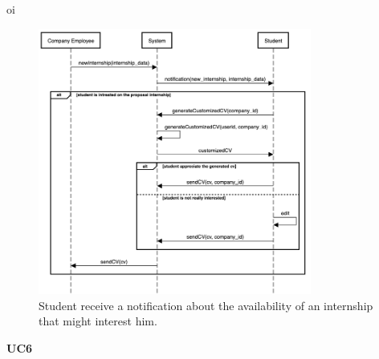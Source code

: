 oi
    \begin{figure}[H]
        \centering
        \includegraphics[width=0.8\textwidth]{RASD/Assets/SequenceDiagrams/5-student-receives-a-notification.png}
        \caption{Student receive a notification about the availability of an internship that might interest him.}
        \label{fig:Student receive a notification about the availability of an internship that might interest him}
    \end{figure}


    \textbf{UC6}
    
